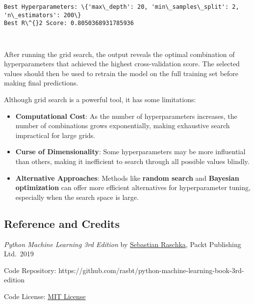 \documentclass{article}
\begin{document}
    \begin{Verbatim}[commandchars=\\\{\}]
Best Hyperparameters: \{'max\_depth': 20, 'min\_samples\_split': 2, 'n\_estimators': 200\}
Best R\^{}2 Score: 0.8050368931785936

    \end{Verbatim}

    \begin{Verbatim}[commandchars=\\\{\}]


    \end{Verbatim}

    After running the grid search, the output reveals the optimal
combination of hyperparameters that achieved the highest
cross-validation score. The selected values should then be used to
retrain the model on the full training set before making final
predictions.

Although grid search is a powerful tool, it has some limitations:

\begin{itemize}
\item
  \textbf{Computational Cost}: As the number of hyperparameters
  increases, the number of combinations grows exponentially, making
  exhaustive search impractical for large grids.
\item
  \textbf{Curse of Dimensionality}: Some hyperparameters may be more
  influential than others, making it inefficient to search through all
  possible values blindly.
\item
  \textbf{Alternative Approaches}: Methods like \textbf{random search}
  and \textbf{Bayesian optimization} can offer more efficient
  alternatives for hyperparameter tuning, especially when the search
  space is large.
\end{itemize}

    \subsection{Reference and Credits}\label{reference-and-credits}

    \emph{Python Machine Learning 3rd Edition} by
\href{https://sebastianraschka.com}{Sebastian Raschka}, Packt Publishing
Ltd.~2019

Code Repository:
https://github.com/rasbt/python-machine-learning-book-3rd-edition

Code License:
\href{https://github.com/rasbt/python-machine-learning-book-3rd-edition/blob/master/LICENSE.txt}{MIT
License}


    
    
    
\end{document}
